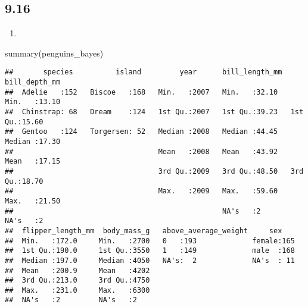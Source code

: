 \documentclass[
]{article}
\newenvironment{Shaded}{\begin{snugshade}}{\end{snugshade}}
\newcommand{\FunctionTok}[1]{\textcolor[rgb]{0.00,0.00,0.00}{#1}}
\newcommand{\NormalTok}[1]{#1}
\providecommand{\tightlist}{%
  \setlength{\itemsep}{0pt}\setlength{\parskip}{0pt}}
\begin{document}
\hypertarget{section-4}{%
\subsection{9.16}\label{section-4}}

\begin{enumerate}
\def\labelenumi{\alph{enumi}.}
\tightlist
\item
\end{enumerate}

\begin{Shaded}
\begin{Highlighting}[]
\FunctionTok{summary}\NormalTok{(penguins\_bayes)}
\end{Highlighting}
\end{Shaded}

\begin{verbatim}
##       species          island         year      bill_length_mm  bill_depth_mm  
##  Adelie   :152   Biscoe   :168   Min.   :2007   Min.   :32.10   Min.   :13.10  
##  Chinstrap: 68   Dream    :124   1st Qu.:2007   1st Qu.:39.23   1st Qu.:15.60  
##  Gentoo   :124   Torgersen: 52   Median :2008   Median :44.45   Median :17.30  
##                                  Mean   :2008   Mean   :43.92   Mean   :17.15  
##                                  3rd Qu.:2009   3rd Qu.:48.50   3rd Qu.:18.70  
##                                  Max.   :2009   Max.   :59.60   Max.   :21.50  
##                                                 NA's   :2       NA's   :2      
##  flipper_length_mm  body_mass_g   above_average_weight     sex     
##  Min.   :172.0     Min.   :2700   0   :193             female:165  
##  1st Qu.:190.0     1st Qu.:3550   1   :149             male  :168  
##  Median :197.0     Median :4050   NA's:  2             NA's  : 11  
##  Mean   :200.9     Mean   :4202                                    
##  3rd Qu.:213.0     3rd Qu.:4750                                    
##  Max.   :231.0     Max.   :6300                                    
##  NA's   :2         NA's   :2
\end{verbatim}
\end{document}
